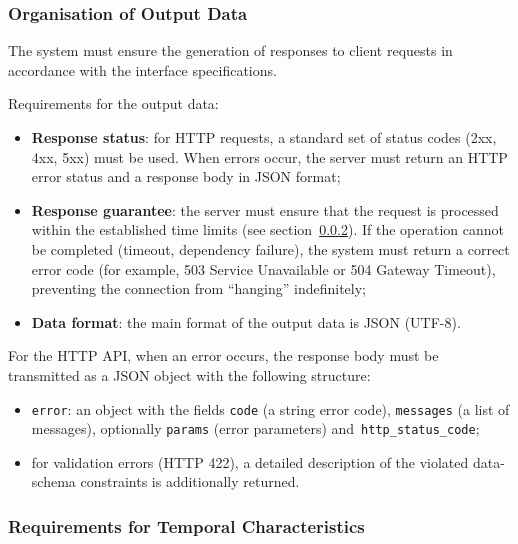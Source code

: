 \documentclass[12pt,a4paper]{extarticle}
\begin{document}
\subsubsection{Organisation of Output Data}
\label{sec:output_data}

\begin{hseExample}
The system must ensure the generation of responses to client requests in accordance with the interface specifications.

Requirements for the output data:
\begin{itemize}[nosep, leftmargin=1.25cm]
    \item \textbf{Response status}: for HTTP requests, a standard set of status codes (2xx, 4xx, 5xx) must be used. When errors occur, the server must return an HTTP error status and a response body in JSON format;
    \item \textbf{Response guarantee}: the server must ensure that the request is processed within the established time limits (see section~\ref{sec:temporal_reqs}). If the operation cannot be completed (timeout, dependency failure), the system must return a correct error code (for example, 503 Service Unavailable or 504 Gateway Timeout), preventing the connection from \enquote{hanging} indefinitely;
    \item \textbf{Data format}: the main format of the output data is JSON (UTF-8).
\end{itemize}

For the HTTP API, when an error occurs, the response body must be transmitted as a JSON object with the following structure:
\begin{itemize}[nosep, leftmargin=1.25cm]
    \item \texttt{error}: an object with the fields \texttt{code} (a string error code), \texttt{messages} (a list of messages), optionally \texttt{params} (error parameters) and~\texttt{http\_status\_code};
    \item for validation errors (HTTP 422), a detailed description of the violated data-schema constraints is additionally returned.
\end{itemize}
\end{hseExample}

\subsubsection{Requirements for Temporal Characteristics}
\label{sec:temporal_reqs}
\end{document}
